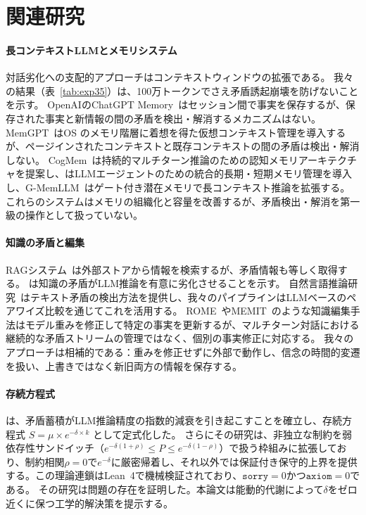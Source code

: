 \documentclass[11pt,a4paper]{article}
\begin{document}
\section{関連研究}
\label{sec:related}

\paragraph{長コンテキストLLMとメモリシステム}
対話劣化への支配的アプローチはコンテキストウィンドウの拡張である。
我々の結果（表~\ref{tab:exp35}）は、100万トークンでさえ矛盾誘起崩壊を防げないことを示す。
OpenAIのChatGPT Memory~\citep{openai2024memory}はセッション間で事実を保存するが、保存された事実と新情報の間の矛盾を検出・解消するメカニズムはない。
MemGPT~\citep{packer2023memgpt}はOS のメモリ階層に着想を得た仮想コンテキスト管理を導入するが、ページインされたコンテキストと既存コンテキストの間の矛盾は検出・解消しない。
CogMem~\citep{cogmem2025}は持続的マルチターン推論のための認知メモリアーキテクチャを提案し、\citet{agenticmem2026}はLLMエージェントのための統合的長期・短期メモリ管理を導入し、G-MemLLM~\citep{gmemllm2026}はゲート付き潜在メモリで長コンテキスト推論を拡張する。
これらのシステムはメモリの組織化と容量を改善するが、矛盾検出・解消を第一級の操作として扱っていない。

\paragraph{知識の矛盾と編集}
RAGシステム~\citep{lewis2020rag}は外部ストアから情報を検索するが、矛盾情報も等しく取得する。
\citet{xie2024knowledge}は知識の矛盾がLLM推論を有意に劣化させることを示す。
自然言語推論研究~\citep{bowman2015snli,williams2018multinli}はテキスト矛盾の検出方法を提供し、我々のパイプラインはLLMベースのペアワイズ比較を通じてこれを活用する。
ROME~\citep{meng2022rome}やMEMIT~\citep{meng2023memit}のような知識編集手法はモデル重みを修正して特定の事実を更新するが、マルチターン対話における継続的な矛盾ストリームの管理ではなく、個別の事実修正に対応する。
我々のアプローチは相補的である：重みを修正せずに外部で動作し、信念の時間的変遷を扱い、上書きではなく新旧両方の情報を保存する。

\paragraph{存続方程式}
\citet{sunagawa2026collapse}は、矛盾蓄積がLLM推論精度の指数的減衰を引き起こすことを確立し、存続方程式 $S = \mu \times e^{-\delta \times k}$ として定式化した。
さらにその研究は、非独立な制約を弱依存性サンドイッチ（$e^{-\delta(1+\rho)} \leq P \leq e^{-\delta(1-\rho)}$）で扱う枠組みに拡張しており、制約相関$\rho = 0$で$e^{-\delta}$に厳密帰着し、それ以外では保証付き保守的上界を提供する。この理論連鎖はLean~4で機械検証されており、$\texttt{sorry} = 0$かつ$\texttt{axiom} = 0$である。
その研究は問題の存在を証明した。本論文は能動的代謝によって$\delta$をゼロ近くに保つ工学的解決策を提示する。
\end{document}

